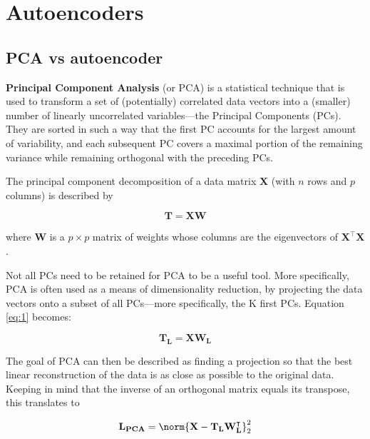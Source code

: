 

\section{Autoencoders}
\label{sec:auto}




\subsection{PCA vs autoencoder}

\textbf{Principal Component Analysis} (or PCA) is a statistical technique that is used to transform a set of (potentially) correlated data vectors into a (smaller) number of linearly uncorrelated variables---the Principal Components (PCs). They are sorted in such a way that the first PC accounts for the largest amount of variability, and each subsequent PC covers a maximal portion of the remaining variance while remaining orthogonal with the preceding PCs.

The principal component decomposition of a data matrix $\mathbf{X}$ (with $n$ rows and $p$ columns) is described by

\begin{equation} \label{eq:1}
	\mathbf{T} = \mathbf{XW}
\end{equation}

where $\mathbf{W}$ is a $p \times p$ matrix of weights whose columns are the eigenvectors of $\mathbf{X^ \intercal X}$. 

Not all PCs need to be retained for PCA to be a useful tool. More specifically, PCA is often used as a means of dimensionality reduction, by projecting the data vectors onto a subset of all PCs---more specifically, the K first PCs. Equation \ref{eq:1} becomes:

\begin{equation} \label{eq:2}
	\mathbf{T_L} = \mathbf{XW_L}
\end{equation}

The goal of PCA can then be described as finding a projection so that the best linear reconstruction of the data is as close as possible to the original data. Keeping in mind that the inverse of an orthogonal matrix equals its transpose, this translates to

\begin{equation} \label{eq:3}
	\mathbf{L_{PCA}} = \norm{\mathbf{X} - \mathbf{T_L W ^\intercal_L  }}_2^2
\end{equation}

